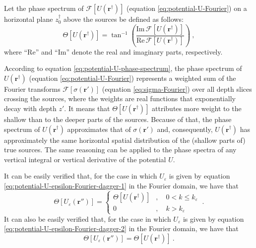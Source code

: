 \documentclass[manuscript,noblind]{geophysics}
\begin{document}
	Let the phase spectrum \cite[e.g.,][ p. 261]{blakely1996} of  
	$\mathcal{F} [ U(\mathbf{r}^{\dagger}) ]$ (equation \ref{eq:potential-U-Fourier}) 
	on a horizontal plane $z^{\dagger}_{0}$ above the sources be defined as follows:
	\begin{equation}
		\Theta [ U(\mathbf{r}^{\dagger}) ] = \tan^{-1} \left( 
		\frac{\text{Im} \, \mathcal{F} [ U(\mathbf{r}^{\dagger}) ]}{\text{Re} \, \mathcal{F} [ U(\mathbf{r}^{\dagger}) ]} 
		\right) \: ,
		\label{eq:potential-U-phase-spectrum}
	\end{equation}
	where ``$\text{Re}$'' and ``$\text{Im}$'' denote the real and imaginary parts, respectively.
	
	According to equation \ref{eq:potential-U-phase-spectrum}, the phase spectrum of $U(\mathbf{r}^{\dagger})$ (equation \ref{eq:potential-U-Fourier}) 
	represents a weighted sum of the Fourier transforms $\mathcal{F} [ \sigma(\mathbf{r}') ]$
	(equation \ref{eq:sigma-Fourier}) over all depth slices crossing the sources,
	where the weights are real functions that exponentially decay with depth $z'$.
	It means that $\Theta [ U(\mathbf{r}^{\dagger}) ]$ attributes more weight to the shallow than to the deeper parts of the sources. 
	Because of that, the phase spectrum of $U(\mathbf{r}^{\dagger})$ approximates that of $\sigma(\mathbf{r}')$ and, consequently, 
	$U(\mathbf{r}^{\dagger})$ has approximately the same horizontal spatial distribution of the (shallow parts of) true sources.
	The same reasoning can be applied to the phase spectra of any vertical integral or vertical derivative of the potential $U$.
	
	It can be easily verified that, for the case in which $U_{\varepsilon}$ is given by equation 
	\ref{eq:potential-U-epsilon-Fourier-dagger-1} in the Fourier domain, we have that
	\begin{equation}
		\Theta [ U_{\varepsilon}(\mathbf{r}'') ] = \begin{cases}
			\Theta [ U(\mathbf{r}^{\dagger}) ] & , \quad 0 < k \le k_{\varepsilon} \\
			0 & , \quad k > k_{\varepsilon}
		\end{cases} \: .
		\label{eq:potential-U-epsilon-1-phase-spectrum}
	\end{equation}
	It can also be easily verified that, for the case in which $U_{\varepsilon}$ is given by equation 
	\ref{eq:potential-U-epsilon-Fourier-dagger-2} in the Fourier domain, we have that
	\begin{equation}
		\Theta [ U_{\varepsilon}(\mathbf{r}'') ] = \Theta [ U(\mathbf{r}^{\dagger}) ] \: .
		\label{eq:potential-U-epsilon-2-phase-spectrum}
	\end{equation}
	
	\clearpage
	
	
	
	\clearpage
	
\end{document}
